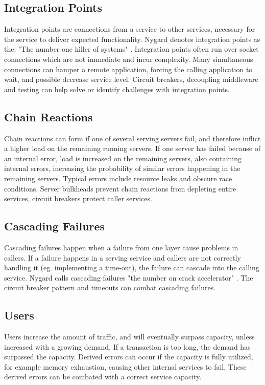 \subsection{Integration Points}
Integration points are connections from a service to other services, necessary for the service to deliver expected functionality. Nygard denotes integration points as the: "The number-one killer of systems" \cite[p. 33]{nygard2007release}. Integration points often run over socket connections which are not immediate and incur complexity. Many simultaneous connections can hamper a remote application, forcing the calling application to wait, and possible decrease service level.
Circuit breakers, decoupling middleware and testing can help solve or identify challenges with integration points.

\subsection{Chain Reactions}
Chain reactions can form if one of several serving servers fail, and therefore inflict a higher load on the remaining running servers. If one server has failed because of an internal error, load is increased on the remaining servers, also containing internal errors, increasing the probability of similar errors happening in the remaining servers. Typical errors include resource leaks and obscure race conditions.
Server bulkheads prevent chain reactions from depleting entire services, circuit breakers protect caller services.

\subsection{Cascading Failures}
Cascading failures happen when a failure from one layer cause problems in callers. If a failure happens in a serving service and callers are not correctly handling it (eg. implementing a time-out), the failure can cascade into the calling service. Nygard calls cascading failures "the number on crack accelerator" \cite[p. 49]{nygard2007release}.
The circuit breaker pattern and timeouts can combat cascading failures.

\subsection{Users}
Users increase the amount of traffic, and will eventually surpass capacity, unless increased with a growing demand. If a transaction is too long, the demand has surpassed the capacity. Derived errors can occur if the capacity is fully utilized, for example memory exhaustion, causing other internal services to fail. These derived errors can be combated with a correct service capacity.

